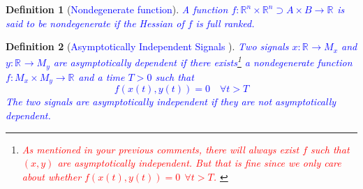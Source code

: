 \documentclass{article}
\newcommand{\R}[1]{\mathbb{R}^{#1}}
\newtheorem{definition}{Definition}
\newcommand{\textblue}[1]{\textcolor{blue}{#1}}
\begin{document}
\begin{definition}[\textblue{Nondegenerate function}]\label{def:nondegenerate_function}
\textblue{A function $f: \R{n}\times \R{n} \supset A\times B \to \R{}$ is said to be nondegenerate if the Hessian of $f$ is full ranked.}
\end{definition}

\begin{definition}[\textblue{Asymptotically Independent Signals \cite{mahony_complementaryFilter}}]
\textblue{Two signals $x : \R{} \to M_x$ and $y : \R{} \to M_y$ are \emph{asymptotically dependent} if there exists\footnote{\textcolor{red}{As mentioned in your previous comments, there will always exist $f$ such that $(x,y)$ are asymptotically independent. But that is fine since we only care about whether $f(x(t), y(t))=0 \:\:\forall t>T$. }} a nondegenerate function $f : M_x\times M_y \to \R{}$ and a time $T>0$ such that \[f(x(t), y(t)) = 0 \quad \forall t > T\]
The two signals are asymptotically independent if they are not asymptotically dependent.      }
\end{definition}
\end{document}
